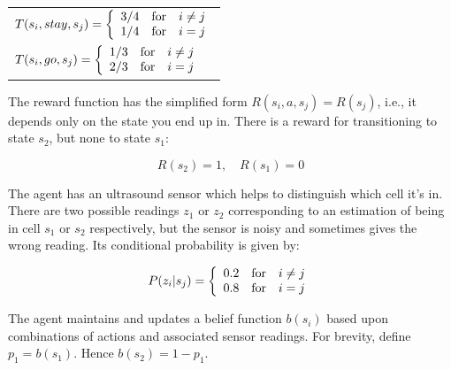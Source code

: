 \documentclass[12pt]{article}
\begin{document}
\begin{center}
\begin{tabular}{l}
$T(s_i,stay,s_j) = \left\{ \begin{array}{lll}
                                   3/4 & \hbox{for} & i\neq j \\
                                   1/4 & \hbox{for} & i = j
                            \end{array}
                    \right.$ \\[.2in]
$T(s_i,go,s_j) = \left\{ \begin{array}{lll}
                                   1/3 & \hbox{for} & i\neq j \\
                                   2/3 & \hbox{for} & i = j
                            \end{array}
                    \right.$
\end{tabular}
\end{center}

\noindent
The reward function has the simplified form $R(s_i,a,s_j) = R(s_j)$,
i.e., it depends only on the state you end up in.  There is a reward
for transitioning to state $s_2$, but none to state $s_1$:

$$R(s_2) = 1, \quad R(s_1) = 0$$

\noindent
The agent has an ultrasound sensor which helps to distinguish which
cell it's in.  There are two possible readings $z_1$ or $z_2$
corresponding to an estimation of being in cell $s_1$ or $s_2$
respectively, but the sensor is noisy and sometimes gives the wrong
reading.  Its conditional probability is given by:

$$P(z_i | s_j) = \left\{ \begin{array}{lll}
                                   0.2 & \hbox{for} & i\neq j \\
                                   0.8 & \hbox{for} & i = j
                            \end{array}
                    \right.$$

\noindent
The agent maintains and updates a belief function $b(s_i)$ based upon
combinations of actions and associated sensor readings.  For brevity,
define $p_1 = b(s_1)$.  Hence $b(s_2) = 1 - p_1$.
\end{document}
